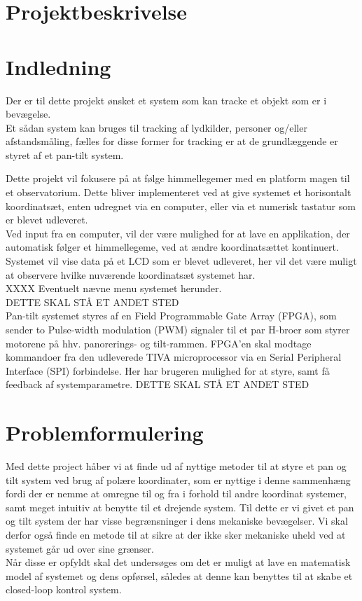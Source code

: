 \section{Projektbeskrivelse}

\section{Indledning}
Der er til dette projekt ønsket et system som kan tracke et objekt som er i bevægelse.\\
Et sådan system kan bruges til tracking af lydkilder, personer og/eller afstandsmåling, fælles for disse former for tracking er at de grundlæggende er styret af et pan-tilt system.

Dette projekt vil fokusere på at følge himmellegemer med en platform magen til et observatorium. Dette bliver implementeret ved at give systemet et horisontalt koordinatsæt, enten udregnet via en computer, eller via et numerisk tastatur som er blevet udleveret.\\
Ved input fra en computer, vil der være mulighed for at lave en applikation, der automatisk følger et himmellegeme, ved at ændre koordinatsættet kontinuert.
Systemet vil vise data på et LCD som er blevet udleveret, her vil det være muligt at observere hvilke nuværende koordinatsæt systemet har.\\
XXXX Eventuelt nævne menu systemet herunder.\\

DETTE SKAL STÅ ET ANDET STED\\
Pan-tilt systemet styres af en Field Programmable Gate Array (FPGA), som sender to Pulse-width modulation (PWM) signaler til et par H-broer som styrer motorene på hhv. panorerings- og tilt-rammen.
FPGA’en skal modtage kommandoer fra den udleverede TIVA microprocessor via en Serial Peripheral Interface (SPI) forbindelse.
Her har brugeren mulighed for at styre, samt få feedback af systemparametre.
DETTE SKAL STÅ ET ANDET STED\\

\section{Problemformulering}
Med dette project håber vi at finde ud af nyttige metoder til at styre et pan og tilt system ved brug af polære koordinater, som er nyttige i denne sammenhæng fordi der er nemme at omregne til og fra i forhold til andre koordinat systemer, samt meget intuitiv at benytte til et drejende system. Til dette er vi givet et pan og tilt system der har visse begrænsninger i dens mekaniske bevægelser. Vi skal derfor også finde en metode til at sikre at der ikke sker mekaniske uheld ved at systemet går ud over sine grænser.
\\
Når disse er opfyldt skal det undersøges om det er muligt at lave en matematisk model af systemet og dens opførsel, således at denne kan benyttes til at skabe et closed-loop kontrol system.\\

